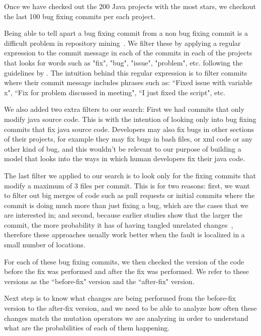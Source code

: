 \documentclass[conference]{IEEEtran}
\begin{document}
Once we have checked out the 200 Java projects with the most stars, we checkout 
the last 100 bug fixing commits per each project. 

Being able to tell apart a bug fixing commit from a non bug fixing commit is a difficult problem in repository mining~\cite{Bird09}. We filter these by applying a regular expression to the commit message in each of the commits in each of the projects that looks for words such as "fix", "bug", "issue", "problem", etc. following the guidelines by \cite{schroter06,Cubranic05,Fischer03}.
The intuition behind this regular expression is to filter commits where their 
commit message includes phrases such as: ``Fixed issue with variable x", ``Fix for 
problem discussed in meeting", ``I just fixed the script", etc.

We also added two extra filters to our search: First we had commits that only 
modify java source code. This is with the intention of looking only into bug 
fixing commits that fix java source code. Developers may also fix bugs in other 
sections of their projects, for example they may fix bugs in bash files, or xml 
code or any other kind of bug, and this wouldn't be relevant to our purpose of 
building a model that looks into the ways in which human developers fix their 
java code.

The last filter we applied to our search is to look only for the fixing commits 
that modify a maximum of 3 files per commit. This is for two reasons: first, we 
want to filter out big merges of code such as pull requests or initial commits 
where the commit is doing much more than just fixing a bug, which are the cases 
that we are interested in; and second, because earlier studies show that the larger the commit, the more probability it has of having tangled unrelated changes~\cite{Dias15,Herzig13,Matsuda15,Kawrykow11}, therefore these approaches usually work 
better when the fault is localized in a small number of locations.

For each of these bug fixing commits, we then checked the version of the code 
before the fix was performed and after the fix was performed. We refer to these 
versions as the ``before-fix" version and the ``after-fix" version.

Next step is to know what changes are being performed from the before-fix version to 
the after-fix version, and we need to be able to analyze how often these changes match the mutation operators we are analyzing in order to understand what are 
the probabilities of each of them happening.
\end{document}
